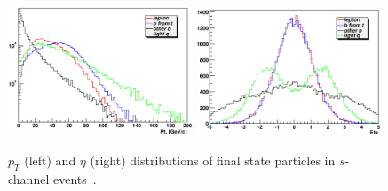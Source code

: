\begin{figure}[!h!tbp]
\begin{center}
\includegraphics[width=0.49\textwidth]{eps/Theory/Hist_tqb_Pt.eps}
\includegraphics[width=0.49\textwidth]{eps/Theory/Hist_tqb_Eta.eps}
\end{center}
\vspace{-0.1in}
\caption{$p_{T}$ (left) and $\eta$ (right) distributions of final state particles in $s$-channel events~\cite{Jabeen:2006km}.}
\label{tchannelevents}
\end{figure}



